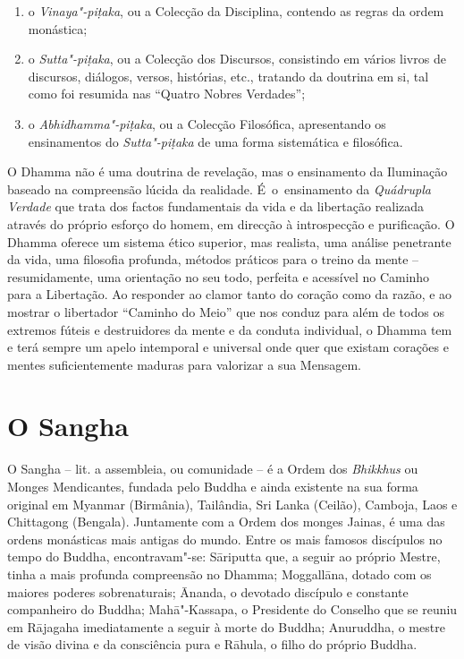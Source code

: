\begin{enumerate}
  \item o \emph{Vinaya"-piṭaka}, ou a Colecção da Disciplina, contendo as regras
        da ordem monástica;

  \item o \emph{Sutta"-piṭaka}, ou a Colecção dos Discursos, consistindo em
        vários livros de discursos, diálogos, versos, histórias, etc., tratando
        da doutrina em si, tal como foi resumida nas ``Quatro Nobres Verdades'';

  \item o \emph{Abhidhamma"-piṭaka}, ou a Colecção Filosófica, apresentando os
        ensinamentos do \emph{Sutta"-piṭaka} de uma forma sistemática e
        filosófica.
\end{enumerate}

O Dhamma não é uma doutrina de revelação, mas o ensinamento da Iluminação
baseado na compreensão lúcida da realidade. É~o~ensinamento da \emph{Quádrupla
  Verdade} que trata dos factos fundamentais da vida e da libertação realizada
através do próprio esforço do homem, em direcção à introspecção e purificação. O
Dhamma oferece um sistema ético superior, mas realista, uma análise
penetrante da vida, uma filosofia profunda, métodos práticos para o treino da
mente -- resumidamente, uma orientação no seu todo, perfeita e acessível no
Caminho para a Libertação. Ao responder ao clamor tanto do coração como da
razão, e ao mostrar o libertador ``Caminho do Meio'' que nos conduz para além de
todos os extremos fúteis e destruidores da mente e da conduta individual, o
Dhamma tem e terá sempre um apelo intemporal e universal onde quer que
existam corações e mentes suficientemente maduras para valorizar a sua Mensagem.

\section{O Sangha}

O Sangha -- lit. a assembleia, ou comunidade -- é a Ordem dos \emph{Bhikkhus} ou
Monges Mendicantes, fundada pelo Buddha e ainda existente na sua forma original
em Myanmar (Birmânia), Tailândia, Sri Lanka (Ceilão), Camboja, Laos e Chittagong
(Bengala). Juntamente com a Ordem dos monges Jainas, é uma das ordens monásticas
mais antigas do mundo. Entre os mais famosos discípulos no tempo do Buddha,
encontravam"-se: Sāriputta que, a seguir ao próprio Mestre, tinha a mais profunda
compreensão no Dhamma; Moggallāna, dotado com os maiores poderes
\mbox{sobrenaturais}; Ānanda, o devotado discípulo e constante companheiro do Buddha;
Mahā"-Kassapa, o Presidente do Conselho que se reuniu em Rājagaha imediatamente a
seguir à morte do Buddha; Anuruddha, o mestre de visão divina e da consciência
pura e Rāhula, o filho do próprio Buddha.


